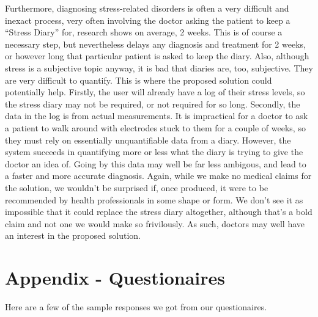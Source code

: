 \documentclass{scrartcl}
\begin{document}
Furthermore, diagnosing stress-related disorders is often a very difficult and inexact process, very often involving the doctor
asking the patient to keep a ``Stress Diary'' for, research shows on average, 2 weeks. This is of course a necessary step, but
nevertheless delays any diagnosis and treatment for 2 weeks, or however long that particular patient is asked to keep the diary.
Also, although stress is a subjective topic anyway, it is bad that diaries are, too, subjective. They are very difficult to
quantify. This is where the proposed solution could potentially help. Firstly, the user will already have a log of their stress
levels, so the stress diary may not be required, or not required for so long. Secondly, the data in the log is from actual
measurements. It is impractical for a doctor to ask a patient to walk around with electrodes stuck to them for a couple of weeks,
so they must rely on essentially unquantifiable data from a diary. However, the system succeeds in quantifying more or less what
the diary is trying to give the doctor an idea of. Going by this data may well be far less ambigous, and lead to a faster and
more accurate diagnosis. Again, while we make no medical claims for the solution, we wouldn't be surprised if, once produced,
it were to be recommended by health professionals in some shape or form. We don't see it as impossible that it could replace
the stress diary altogether, although that's a bold claim and not one we would make so frivilously. As such, doctors may
well have an interest in the proposed solution.

\section{Appendix - Questionaires}
Here are a few of the sample responses we got from our questionaires.






\end{document}
